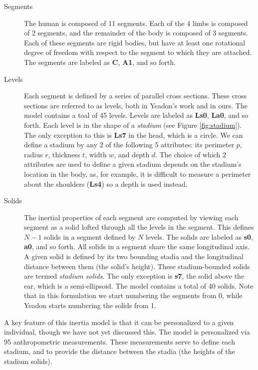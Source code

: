 \documentclass[10pt]{article}
\begin{document}
\begin{description}
    \item[Segments]
        The human is composed of 11 segments. Each of the 4 limbs is
        composed of 2 segments, and the remainder of the body is composed of 3
        segments. Each of these segments are rigid bodies, but have at least
        one rotational degree of freedom with respect to the segment to which
        they are attached.  The segments are labeled as \textbf{C},
        \textbf{A1}, and so forth.
    \item[Levels]
        Each segment is defined by a series of parallel cross sections.
        These cross sections are referred to as levels, both in
        Yeadon's work and in ours. The model contains a toal of 45 levels.
        Levels are labeled as \textbf{Ls0}, \textbf{La0}, and so forth.  Each
        level is in the shape of a \emph{stadium} (see Figure
        \ref{fig:stadium}). The only exception to this is \textbf{Ls7} in the
        head, which is a circle. We can define a stadium by any 2 of the
        following 5 attributes: its perimeter $p$, radius $r$, thickness $t$,
        width $w$, and depth $d$.  The choice of which 2 attributes are used to
        define a given stadium depends on the stadium's location in the body,
        as, for example, it is difficult to measure a perimeter about the
        shoulders (\textbf{Ls4}) so a depth is used instead.
    \item[Solids]
        The inertial properties of each segment are computed by viewing each
        segment as a solid lofted through all the levels in the segment. This
        defines $N-1$ solids in a segment defined by $N$ levels. The solids are
        labeled as \textbf{s0}, \textbf{a0}, and so forth. All solids in a
        segment share the same longitudinal axis. A given solid is
        defined by its two bounding stadia and the longitudinal distance
        between them (the solid's height). These stadium-bounded solids are
        termed \emph{stadium solids}. The only exception is \textbf{s7}, the
        solid above the ear, which is a semi-ellipsoid. The model contains a
        total of 40 solids.  Note that in this formulation we start numbering
        the segments from 0, while Yeadon starts numbering the solids from 1.
\end{description}

A key feature of this inertia model is that it can be personalized to a given
individual, though we have not yet discussed this. The model is
personalized via 95 anthropometric measurements. These measurements serve to
define each stadium, and to provide the distance between the stadia (the
heights of the stadium solids).
\end{document}
